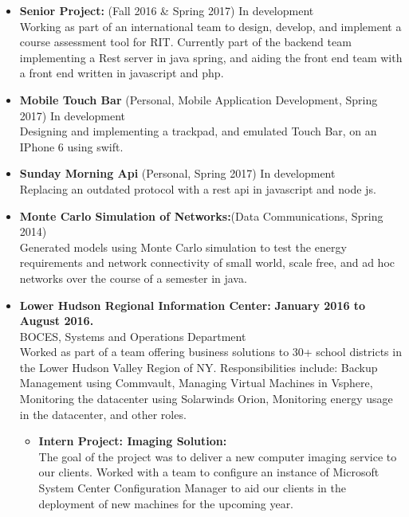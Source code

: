 \documentclass[10pt]{article}
\begin{document}
\begin{itemize}[topsep=1ex, itemsep=1ex, partopsep=0ex, parsep=.25ex]
		\item[] {\bf Senior Project:} (Fall 2016 \& Spring 2017) In development\\
		Working as part of an international team to design, develop, and implement a course assessment tool for RIT. Currently part of the backend team implementing a Rest server in java spring, and aiding the front end  team with a front end written in javascript and php.
        \item[] {\bf Mobile Touch Bar} (Personal, Mobile Application Development, Spring 2017) In development\\
        Designing and implementing a trackpad, and emulated Touch Bar, on an IPhone 6 using swift.
        \item[] {\bf Sunday Morning Api} (Personal, Spring 2017) In development\\
        Replacing an outdated protocol with a rest api in javascript and node js.
	    \item[] {\bf Monte Carlo Simulation of Networks:}(Data Communications, Spring 2014)\\
	    Generated models using Monte Carlo simulation to test the energy requirements and network connectivity of small world, scale free, and ad hoc networks over the course of a semester in java.
\end{itemize}
\vspace{.75ex}
\begin{itemize}[topsep=1ex, itemsep=1ex, partopsep=0ex, parsep=.25ex]
	\item[] {{\bf Lower Hudson Regional Information Center:} \hfill {\bf January 2016 to August 2016.}}\\
	BOCES, Systems and Operations Department\\
	Worked as part of a team offering business solutions to 30+ school districts in the Lower Hudson Valley Region of NY. Responsibilities include: Backup Management using Commvault, Managing Virtual Machines in Vsphere, Monitoring the datacenter using Solarwinds Orion, Monitoring energy usage in the datacenter, and other roles.
	\begin{itemize} [topsep=.5ex, itemsep=.25ex, partopsep=0ex, parsep=.25ex]
		\item[] {\bf Intern Project: Imaging Solution:}\\
		The goal of the project was to deliver a new computer imaging service to our clients. Worked with a team to configure an instance of Microsoft System Center Configuration Manager to aid our clients in the deployment of new machines for the upcoming year. 
	\end{itemize}
\end{itemize}
\end{document}
